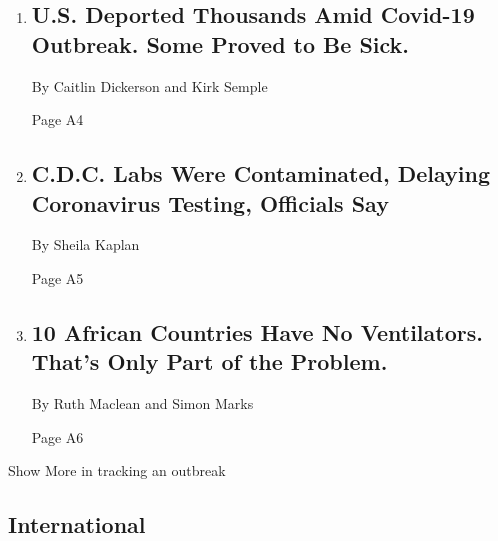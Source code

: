 \begin{enumerate}
\def\labelenumi{\arabic{enumi}.}
\item
  \href{/2020/04/18/us/deportations-coronavirus-guatemala.html}{}

  \hypertarget{us-deported-thousands-amid-covid-19-outbreak-some-proved-to-be-sick}{%
  \subsection{U.S. Deported Thousands Amid Covid-19 Outbreak. Some
  Proved to Be
  Sick.}\label{us-deported-thousands-amid-covid-19-outbreak-some-proved-to-be-sick}}

  By Caitlin Dickerson and Kirk Semple

  Page A4
\item
  \href{/2020/04/18/health/cdc-coronavirus-lab-contamination-testing.html}{}

  \hypertarget{cdc-labs-were-contaminated-delaying-coronavirus-testing-officials-say}{%
  \subsection{C.D.C. Labs Were Contaminated, Delaying Coronavirus
  Testing, Officials
  Say}\label{cdc-labs-were-contaminated-delaying-coronavirus-testing-officials-say}}

  By Sheila Kaplan

  Page A5
\item
  \href{/2020/04/18/world/africa/africa-coronavirus-ventilators.html}{}

  \hypertarget{10-african-countries-have-no-ventilators-thats-only-part-of-the-problem}{%
  \subsection{10 African Countries Have No Ventilators. That's Only Part
  of the
  Problem.}\label{10-african-countries-have-no-ventilators-thats-only-part-of-the-problem}}

  By Ruth Maclean and Simon Marks

  Page A6
\end{enumerate}

Show More in tracking an outbreak

\hypertarget{international}{%
\subsection{International}\label{international}}

